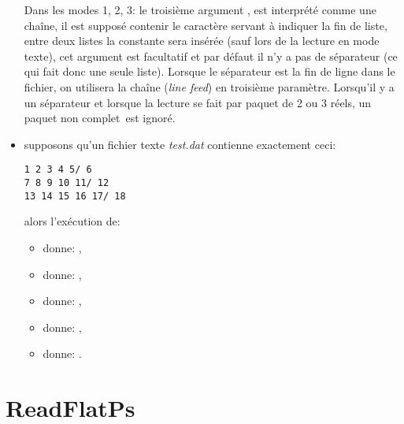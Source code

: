\begin{itemize}
 Dans les modes 1, 2, 3: le troisième argument , est interprété comme une chaîne, il est supposé contenir le caractère servant à indiquer la fin de liste, entre deux listes la constante \jump sera insérée (sauf lors de la lecture en mode texte), cet argument est facultatif et par défaut il n'y a pas de séparateur (ce qui fait donc une seule liste). Lorsque le séparateur est la fin de ligne dans le fichier, on utilisera la chaîne  (\textit{line feed}) en troisième paramètre. Lorsqu'il y a un séparateur et lorsque la lecture se fait par paquet de 2 ou 3 réels, un paquet non \og complet\fg\ est ignoré.
 \item \exem supposons qu'un fichier texte \textit{test.dat} contienne exactement ceci:

\begin{verbatim}
1 2 3 4 5/ 6
7 8 9 10 11/ 12
13 14 15 16 17/ 18
\end{verbatim}

alors l'exécution de:
  \begin{itemize}
  \item {} donne: \res{[1+2*i,3+4*i,5+6*i,7+8*i,9+10*i,11+12*i,13+14*i,15+16*i,17+18*i]},
  \item {} donne: ,
  \item {} donne: ,
  \item {} donne: ,
  \item {} donne: .
  \end{itemize}
\end{itemize}


\section{ReadFlatPs}\label{cmdReadFlatPs}

